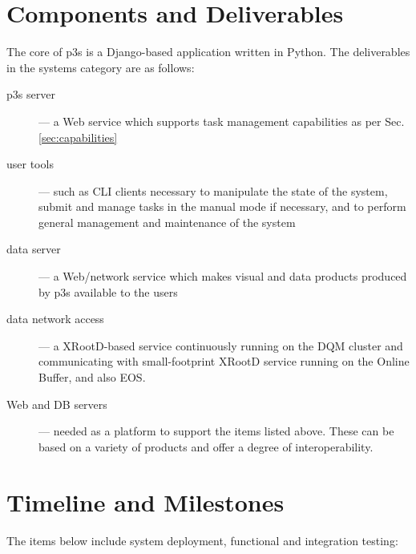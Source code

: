 \documentclass[pdftex,12pt,letter]{article}
\begin{document}
\section{Components and Deliverables}

The core of p3s is a Django-based \cite{django} application written in Python. The
deliverables in the systems category are as follows:

\begin{description}
\item[p3s server] --- a Web service which supports task management capabilities as per Sec.\,\ref{sec:capabilities}

\item[user tools] --- such as CLI clients necessary to manipulate the state of the system, submit
and manage tasks in the manual mode if necessary, and to perform general management and
maintenance of the system

\item[data server] --- a Web/network service which makes visual and data products produced by p3s
available to the users

\item[data network access] --- a XRootD-based service continuously running on the DQM cluster
and communicating with small-footprint XRootD service running on the Online Buffer, and also EOS.

\item[Web and DB servers] --- needed as a platform to support the items listed above. These
can be based on a variety of products and offer a degree of interoperability.

\end{description}

\noindent 

\section{Timeline and Milestones}

The items below include system deployment, functional and integration testing:
\end{document}
